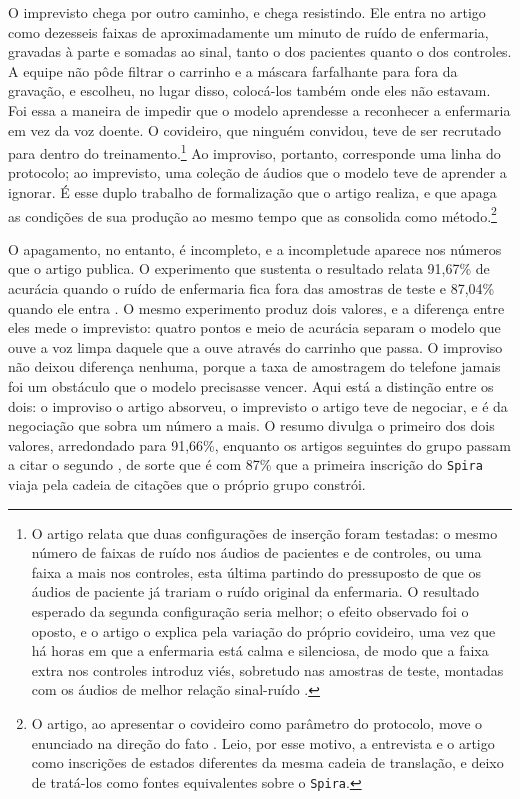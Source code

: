 O imprevisto chega por outro caminho, e chega resistindo. Ele entra no artigo como dezesseis faixas de aproximadamente um minuto de ruído de enfermaria, gravadas à parte e somadas ao sinal, tanto o dos pacientes quanto o dos controles. A equipe não pôde filtrar o carrinho e a máscara farfalhante para fora da gravação, e escolheu, no lugar disso, colocá-los também onde eles não estavam. Foi essa a maneira de impedir que o modelo aprendesse a reconhecer a enfermaria em vez da voz doente. O covideiro, que ninguém convidou, teve de ser recrutado para dentro do treinamento.\footnote{O artigo relata que duas configurações de inserção foram testadas: o mesmo número de faixas de ruído nos áudios de pacientes e de controles, ou uma faixa a mais nos controles, esta última partindo do pressuposto de que os áudios de paciente já trariam o ruído original da enfermaria. O resultado esperado da segunda configuração seria melhor; o efeito observado foi o oposto, e o artigo o explica pela variação do próprio covideiro, uma vez que há horas em que a enfermaria está calma e silenciosa, de modo que a faixa extra nos controles introduz viés, sobretudo nas amostras de teste, montadas com os áudios de melhor relação sinal-ruído \parencite{Casanova2021DeepLearning}.} Ao improviso, portanto, corresponde uma linha do protocolo; ao imprevisto, uma coleção de áudios que o modelo teve de aprender a ignorar. É esse duplo trabalho de formalização que o artigo realiza, e que apaga as condições de sua produção ao mesmo tempo que as consolida como método.\footnote{O artigo, ao apresentar o covideiro como parâmetro do protocolo, move o enunciado na direção do fato \parencite{Latour2011CienciaEmAcao}. Leio, por esse motivo, a entrevista e o artigo como inscrições de estados diferentes da mesma cadeia de translação, e deixo de tratá-los como fontes equivalentes sobre o \texttt{Spira}.}

O apagamento, no entanto, é incompleto, e a incompletude aparece nos números que o artigo publica. O experimento que sustenta o resultado relata 91,67\% de acurácia quando o ruído de enfermaria fica fora das amostras de teste e 87,04\% quando ele entra \parencite{Casanova2021DeepLearning}. O mesmo experimento produz dois valores, e a diferença entre eles mede o imprevisto: quatro pontos e meio de acurácia separam o modelo que ouve a voz limpa daquele que a ouve através do carrinho que passa. O improviso não deixou diferença nenhuma, porque a taxa de amostragem do telefone jamais foi um obstáculo que o modelo precisasse vencer. Aqui está a distinção entre os dois: o improviso o artigo absorveu, o imprevisto o artigo teve de negociar, e é da negociação que sobra um número a mais. O resumo divulga o primeiro dos dois valores, arredondado para 91,66\%, enquanto os artigos seguintes do grupo passam a citar o segundo \parencite{Gauy2021MFCC, Gauy2024Discriminant}, de sorte que é com 87\% que a primeira inscrição do \texttt{Spira} viaja pela cadeia de citações que o próprio grupo constrói.

